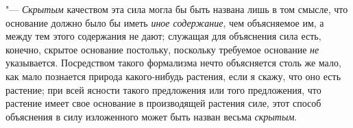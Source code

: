 "--- {\em Скрытым} качеством эта сила могла бы быть
названа лишь в том смысле, что основание должно было бы иметь
{\em иное содержание}, чем объясняемое им, а между тем
этого содержания не дают; служащая для объяснения сила есть, конечно,
скрытое основание постольку, поскольку требуемое основание
{\em не} указывается. Посредством такого формализма
нечто объясняется столь же мало, как мало познается природа какого-нибудь
растения, если я скажу, что оно есть растение; при всей ясности такого
предложения или того предложения, что растение имеет свое основание в
производящей растения силе,
этот способ объяснения в силу изложенного может быть назван весьма
{\em скрытым}.


